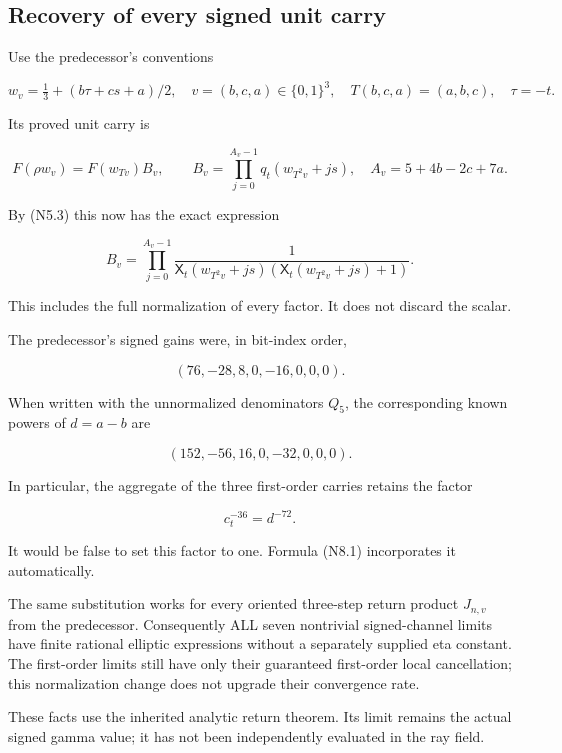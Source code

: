 \hypertarget{N-recovery-of-every-signed-unit-carry}{%
\subsection{Recovery of every signed unit
carry}\label{N-recovery-of-every-signed-unit-carry}}

Use the predecessor's conventions

\[
 w_v=\tfrac13+(b\tau+cs+a)/2,\quad v=(b,c,a)\in\{0,1\}^3,
 \quad T(b,c,a)=(a,b,c),\quad \tau=-t.
\]

Its proved unit carry is

\[
 F(\rho w_v)=F(w_{Tv})B_v,\qquad
 B_v=\prod_{j=0}^{A_v-1}q_t(w_{T^2v}+js),
 \quad A_v=5+4b-2c+7a.
\]

By (N5.3) this now has the exact expression

\[
 \boxed{
 B_v=\prod_{j=0}^{A_v-1}
 \frac1{\mathsf X_t(w_{T^2v}+js)
             (\mathsf X_t(w_{T^2v}+js)+1)}.
 }                                                       \tag{N8.1}
\]

This includes the full normalization of every factor. It does not
discard the scalar.

The predecessor's signed gains were, in bit-index order,

\[
 (76,-28,8,0,-16,0,0,0).
\]

When written with the unnormalized denominators \(Q_5\), the
corresponding known powers of \(d=a-b\) are

\[
 (152,-56,16,0,-32,0,0,0).
\]

In particular, the aggregate of the three first-order carries retains
the factor

\[
 c_t^{-36}=d^{-72}.                                      \tag{N8.2}
\]

It would be false to set this factor to one. Formula (N8.1) incorporates
it automatically.

The same substitution works for every oriented three-step return product
\(J_{n,v}\) from the predecessor. Consequently ALL seven nontrivial
signed-channel limits have finite rational elliptic expressions without
a separately supplied eta constant. The first-order limits still have
only their guaranteed first-order local cancellation; this normalization
change does not upgrade their convergence rate.

These facts use the inherited analytic return theorem. Its limit remains
the actual signed gamma value; it has not been independently evaluated
in the ray field.
